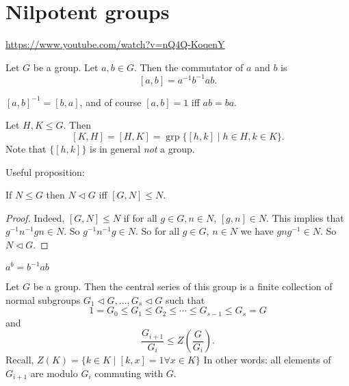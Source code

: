 \part{Nilpotent groups}
\url{https://www.youtube.com/watch?v=nQ4Q-KoqenY}

\begin{definition}[Commutator]
    Let $G$ be a group.
    Let $a, b \in G$. Then the commutator of $a$ and $b$ is
    \[
        [a, b] = a^{-1} b^{-1} a b
    .\] 
\end{definition}

\begin{remark}
    $[a,b]^{-1} = [b, a]$, and of course $[a, b] = 1$ iff  $ab = ba$.
\end{remark}


\begin{definition}
    Let $H, K \le G$.
    Then \[
       [K, H] = [H, K] =  \operatorname{grp} \{[h, k]  \mid  h \in H, k \in K\}.
    \]
    Note that $\{[h, k]\}$ is in general \emph{not} a group.
\end{definition}

Useful proposition:

\begin{prop}
If $N \le G$ then $N\triangleleft G$ iff $[G, N] \le N$.
\end{prop}
\begin{proof}
    Indeed, $[G, N] \le N$ if for all $g \in G, n \in N$, $[g, n ] \in N$.
    This implies that $g^{-1} n^{-1} g n \in N$.
    So $g ^{-1} n^{-1} g \in N$.
    So for all $g \in G$, $n \in N$ we have $g n g^{-1} \in N$.
    So $N \triangleleft G$.
\end{proof}

\begin{remark}[Notation]
    $a^{b} = b^{-1} a b$
\end{remark}


\begin{definition}
    Let $G$ be a group. Then the central series of this group is a finite collection of normal subgroups $G_1 \triangleleft G, \ldots, G_s \triangleleft G$ such that
        \[
        1 = G_0 \le  G_1 \le  G_2 \le \cdots \le  G_{s-1} \le G_s = G
    \]
    and
    \[
        \frac{G_{i+1}}{G_i} \le Z\left(\frac{G}{G_{i}}\right) \tag{$*$}
    .\] 
    Recall, $Z(K) = \{k \in K  \mid [k, x] = 1 \forall x \in K\} $
    In other words: all elements of $G_{i+1}$ are modulo $G_i$ commuting with  $G$.
\end{definition}

